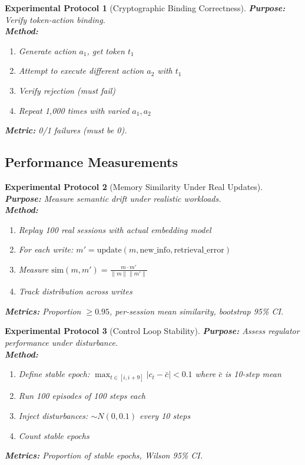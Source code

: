 \documentclass[12pt]{article}
\newtheorem{protocol}{Experimental Protocol}[section]
\begin{document}
\begin{protocol}[Cryptographic Binding Correctness]
\textbf{Purpose:} Verify token-action binding.\\
\textbf{Method:}
\begin{enumerate}
    \item Generate action $a_1$, get token $t_1$
    \item Attempt to execute different action $a_2$ with $t_1$
    \item Verify rejection (must fail)
    \item Repeat 1,000 times with varied $a_1, a_2$
\end{enumerate}
\textbf{Metric:} 0/1 failures (must be 0).
\end{protocol}

\subsection{Performance Measurements}

\begin{protocol}[Memory Similarity Under Real Updates]
\textbf{Purpose:} Measure semantic drift under realistic workloads.\\
\textbf{Method:}
\begin{enumerate}
    \item Replay 100 real sessions with actual embedding model
    \item For each write: $m' = \text{update}(m, \text{new\_info}, \text{retrieval\_error})$
    \item Measure $\text{sim}(m, m') = \frac{m \cdot m'}{\|m\|\|m'\|}$
    \item Track distribution across writes
\end{enumerate}
\textbf{Metrics:} Proportion $\geq 0.95$, per-session mean similarity, bootstrap 95\% CI.
\end{protocol}

\begin{protocol}[Control Loop Stability]
\textbf{Purpose:} Assess regulator performance under disturbance.\\
\textbf{Method:}
\begin{enumerate}
    \item Define stable epoch: $\max_{t \in [i,i+9]} |c_t - \bar{c}| < 0.1$ where $\bar{c}$ is 10-step mean
    \item Run 100 episodes of 100 steps each
    \item Inject disturbances: $\sim N(0, 0.1)$ every 10 steps
    \item Count stable epochs
\end{enumerate}
\textbf{Metrics:} Proportion of stable epochs, Wilson 95\% CI.
\end{protocol}
\end{document}
